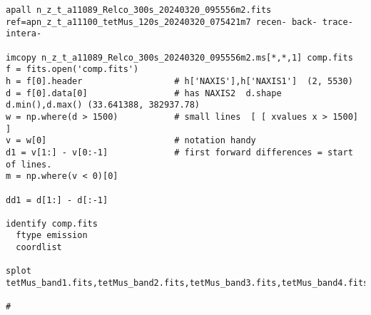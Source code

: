 \begin{verbatim}
apall n_z_t_a11089_Relco_300s_20240320_095556m2.fits ref=apn_z_t_a11100_tetMus_120s_20240320_075421m7 recen- back- trace- intera-

imcopy n_z_t_a11089_Relco_300s_20240320_095556m2.ms[*,*,1] comp.fits
f = fits.open('comp.fits')
h = f[0].header                  # h['NAXIS'],h['NAXIS1']  (2, 5530)
d = f[0].data[0]                 # has NAXIS2  d.shape  d.min(),d.max() (33.641388, 382937.78)
w = np.where(d > 1500)           # small lines  [ [ xvalues x > 1500] ]
v = w[0]                         # notation handy
d1 = v[1:] - v[0:-1]             # first forward differences = start of lines.
m = np.where(v < 0)[0]

dd1 = d[1:] - d[:-1]

identify comp.fits
  ftype emission
  coordlist

splot tetMus_band1.fits,tetMus_band2.fits,tetMus_band3.fits,tetMus_band4.fits

#
\end{verbatim}
\endgroup
